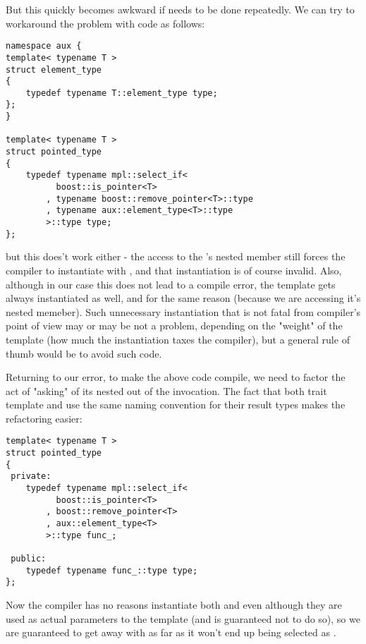 \documentclass{netobjectdays}
\begin{document}
But this quickly becomes awkward if needs to be done 
repeatedly. We can try to workaround the problem with 
 code as follows:

{\footnotesize
\begin{verbatim}
namespace aux {
template< typename T >
struct element_type
{
	typedef typename T::element_type type;
};
}

template< typename T >
struct pointed_type
{
    typedef typename mpl::select_if<
          boost::is_pointer<T>
        , typename boost::remove_pointer<T>::type
        , typename aux::element_type<T>::type
        >::type type;
};
\end{verbatim}
}

but this does't work either - the access to the 
's nested  member still 
forces the compiler to instantiate 
with , and that instantiation is of course 
invalid. Also, although in our case this does not lead to a 
compile error, the  template 
gets always instantiated as well, and for the same reason 
(because we are accessing it's nested  memeber). 
Such unnecessary instantiation that is not fatal from 
compiler's point of view may or may be not a problem, 
depending on the "weight" of the template (how much the 
instantiation taxes the compiler), but a general rule of 
thumb would be to avoid such code.

Returning to our error, to make the above code compile, we 
need to factor the act of "asking" 
of its nested  out of the  
invocation. The fact that both 
trait template and  use the same 
naming convention for their result types makes the refactoring 
easier:

{\footnotesize
\begin{verbatim}
template< typename T >
struct pointed_type
{
 private:
    typedef typename mpl::select_if<
          boost::is_pointer<T>
        , boost::remove_pointer<T>
        , aux::element_type<T>
        >::type func_;

 public:
    typedef typename func_::type type;
};
\end{verbatim}
}

Now the compiler has no reasons instantiate both 
 and 
 even although they are used as 
actual parameters to the  template (and is 
guaranteed not to do so), so we are guaranteed to get away with 
 as far as it won't end up being 
selected as .
\end{document}
